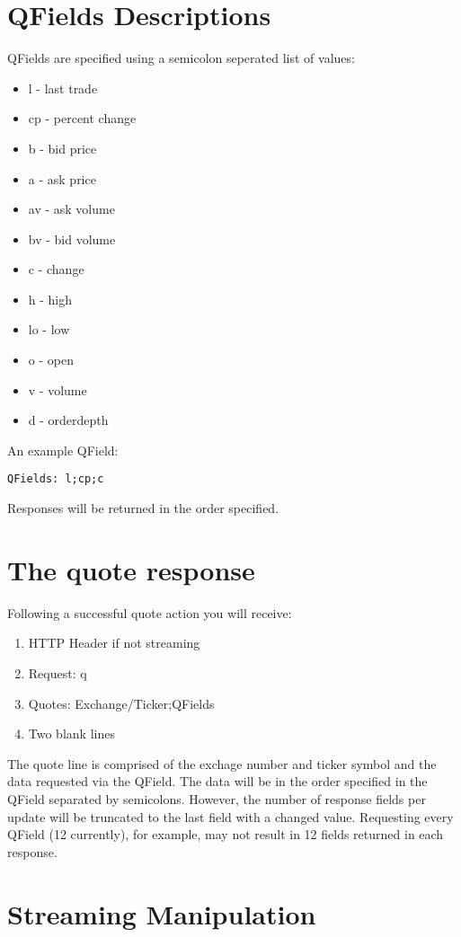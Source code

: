 \documentclass[12pt,twoside,letterpaper]{report}
\begin{document}
\section*{QFields Descriptions}
QFields are specified using a semicolon seperated list of values:
\begin{itemize}
\item l - last trade
\item cp - percent change
\item b - bid price
\item a - ask price
\item av - ask volume
\item bv - bid volume
\item c - change
\item h - high
\item lo - low
\item o - open
\item v - volume
\item d - orderdepth
\end{itemize}

An example QField:
\begin{verbatim}
QFields: l;cp;c
\end{verbatim} 

Responses will be returned in the order specified.

\section*{The quote response}
Following a successful quote action you will receive:

\begin{enumerate}
\item HTTP Header if not streaming
\item Request: q
\item Quotes: Exchange/Ticker;QFields
\item Two blank lines
\end{enumerate}

The quote line is comprised of the exchage number and ticker symbol and the data requested via the QField. The data will be in the order specified in the QField separated by semicolons. However, the number of response fields per update will be truncated to the last field with a changed value. Requesting every QField (12 currently), for example, may not result in 12 fields returned in each response.

\section*{Streaming Manipulation}
\end{document}
